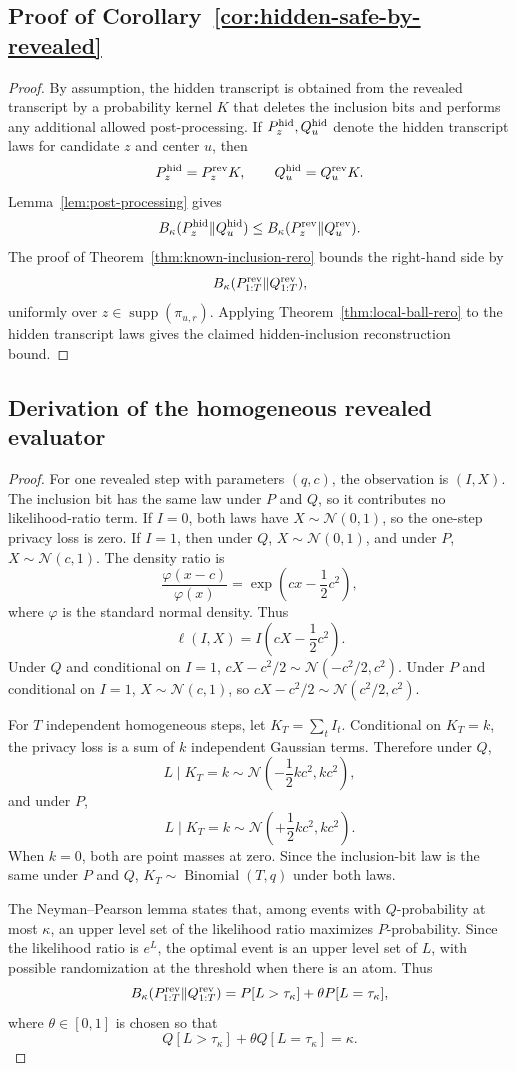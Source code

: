 \documentclass[11pt,a4paper]{report}
\theoremstyle{plain}
\theoremstyle{definition}
\theoremstyle{remark}
\DeclareMathOperator{\supp}{supp}
\DeclareMathOperator{\Bin}{Binomial}
\newcommand{\N}{\mathcal{N}}
\begin{document}
\subsection{Proof of Corollary~\ref{cor:hidden-safe-by-revealed}}

\begin{proof}
By assumption, the hidden transcript is obtained from the revealed transcript by
a probability kernel $K$ that deletes the inclusion bits and performs any
additional allowed post-processing.  If $P_z^{\rm hid},Q_u^{\rm hid}$ denote the
hidden transcript laws for candidate $z$ and center $u$, then
\[
P_z^{\rm hid}=P_z^{\rm rev}K,
\qquad
Q_u^{\rm hid}=Q_u^{\rm rev}K.
\]
Lemma~\ref{lem:post-processing} gives
\[
B_\kappa(P_z^{\rm hid}\|Q_u^{\rm hid})
\le
B_\kappa(P_z^{\rm rev}\|Q_u^{\rm rev}).
\]
The proof of Theorem~\ref{thm:known-inclusion-rero} bounds the right-hand side
by
\[
B_\kappa(P_{1:T}^{\rm rev}\|Q_{1:T}^{\rm rev}),
\]
uniformly over $z\in\supp(\pi_{u,r})$.  Applying
Theorem~\ref{thm:local-ball-rero} to the hidden transcript laws gives the
claimed hidden-inclusion reconstruction bound.
\end{proof}

\subsection{Derivation of the homogeneous revealed evaluator}

\begin{proof}
For one revealed step with parameters $(q,c)$, the observation is $(I,X)$.  The
inclusion bit has the same law under $P$ and $Q$, so it contributes no
likelihood-ratio term.  If $I=0$, both laws have $X\sim\N(0,1)$, so the
one-step privacy loss is zero.  If $I=1$, then under $Q$, $X\sim\N(0,1)$, and
under $P$, $X\sim\N(c,1)$.  The density ratio is
\[
\frac{\varphi(x-c)}{\varphi(x)}
=
\exp\left(cx-\frac12c^2\right),
\]
where $\varphi$ is the standard normal density.  Thus
\[
\ell(I,X)=I\left(cX-\frac12c^2\right).
\]
Under $Q$ and conditional on $I=1$, $cX-c^2/2\sim\N(-c^2/2,c^2)$.  Under $P$
and conditional on $I=1$, $X\sim\N(c,1)$, so
$cX-c^2/2\sim\N(c^2/2,c^2)$.

For $T$ independent homogeneous steps, let $K_T=\sum_t I_t$.  Conditional on
$K_T=k$, the privacy loss is a sum of $k$ independent Gaussian terms.  Therefore
under $Q$,
\[
L\mid K_T=k\sim\N\left(-\frac12kc^2,kc^2\right),
\]
and under $P$,
\[
L\mid K_T=k\sim\N\left(+\frac12kc^2,kc^2\right).
\]
When $k=0$, both are point masses at zero.  Since the inclusion-bit law is the
same under $P$ and $Q$, $K_T\sim\Bin(T,q)$ under both laws.

The Neyman--Pearson lemma states that, among events with $Q$-probability at
most $\kappa$, an upper level set of the likelihood ratio maximizes
$P$-probability.  Since the likelihood ratio is $e^L$, the optimal event is an
upper level set of $L$, with possible randomization at the threshold when there
is an atom.  Thus
\[
B_\kappa(P_{1:T}^{\rm rev}\|Q_{1:T}^{\rm rev})
=
P[L>\tau_\kappa]+\theta P[L=\tau_\kappa],
\]
where $\theta\in[0,1]$ is chosen so that
\[
Q[L>\tau_\kappa]+\theta Q[L=\tau_\kappa]=\kappa.
\]
\end{proof}
\end{document}

